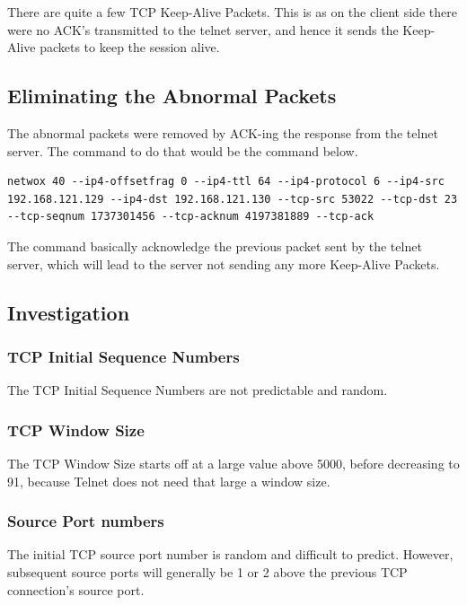 \documentclass[12pt]{article}
\begin{document}
There are quite a few TCP Keep-Alive Packets. This is as on the client side there were no ACK's transmitted to the telnet server, and hence it sends the Keep-Alive packets to keep the session alive.\\

\subsection{Eliminating the Abnormal Packets}
The abnormal packets were removed by ACK-ing the response from the telnet server. The command to do that would be the command below.\\

\begin{lstlisting}
netwox 40 --ip4-offsetfrag 0 --ip4-ttl 64 --ip4-protocol 6 --ip4-src 192.168.121.129 --ip4-dst 192.168.121.130 --tcp-src 53022 --tcp-dst 23 --tcp-seqnum 1737301456 --tcp-acknum 4197381889 --tcp-ack
\end{lstlisting}

The command basically acknowledge the previous packet sent by the telnet server, which will lead to the server not sending any more Keep-Alive Packets.\\

\subsection{Investigation}
\subsubsection{TCP Initial Sequence Numbers}
The TCP Initial Sequence Numbers are not predictable and random.

\subsubsection{TCP Window Size}
The TCP Window Size starts off at a large value above 5000, before decreasing to 91, because Telnet does not need that large a window size. 

\subsubsection{Source Port numbers}
The initial TCP source port number is random and difficult to predict. However, subsequent source ports will generally be 1 or 2 above the previous TCP connection's source port.
\enddocument
\end{document}
